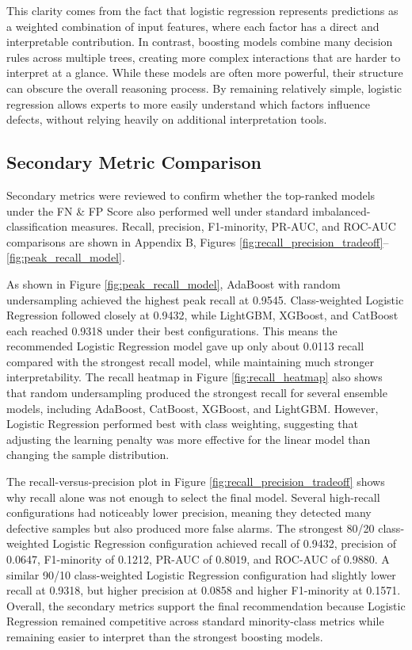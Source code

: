 \documentclass{article}
\begin{document}
This clarity comes from the fact that logistic regression represents predictions as a weighted combination of input features, where each factor has a direct and interpretable contribution. In contrast, boosting models combine many decision rules across multiple trees, creating more complex interactions that are harder to interpret at a glance. While these models are often more powerful, their structure can obscure the overall reasoning process. By remaining relatively simple, logistic regression allows experts to more easily understand which factors influence defects, without relying heavily on additional interpretation tools.

\subsection{Secondary Metric Comparison}

Secondary metrics were reviewed to confirm whether the top-ranked models under the FN \& FP Score also performed well under standard imbalanced-classification measures. Recall, precision, F1-minority, PR-AUC, and ROC-AUC comparisons are shown in Appendix B, Figures \ref{fig:recall_precision_tradeoff}--\ref{fig:peak_recall_model}.

As shown in Figure \ref{fig:peak_recall_model}, AdaBoost with random undersampling achieved the highest peak recall at 0.9545. Class-weighted Logistic Regression followed closely at 0.9432, while LightGBM, XGBoost, and CatBoost each reached 0.9318 under their best configurations. This means the recommended Logistic Regression model gave up only about 0.0113 recall compared with the strongest recall model, while maintaining much stronger interpretability. The recall heatmap in Figure \ref{fig:recall_heatmap} also shows that random undersampling produced the strongest recall for several ensemble models, including AdaBoost, CatBoost, XGBoost, and LightGBM. However, Logistic Regression performed best with class weighting, suggesting that adjusting the learning penalty was more effective for the linear model than changing the sample distribution.

The recall-versus-precision plot in Figure \ref{fig:recall_precision_tradeoff} shows why recall alone was not enough to select the final model. Several high-recall configurations had noticeably lower precision, meaning they detected many defective samples but also produced more false alarms. The strongest 80/20 class-weighted Logistic Regression configuration achieved recall of 0.9432, precision of 0.0647, F1-minority of 0.1212, PR-AUC of 0.8019, and ROC-AUC of 0.9880. A similar 90/10 class-weighted Logistic Regression configuration had slightly lower recall at 0.9318, but higher precision at 0.0858 and higher F1-minority at 0.1571. Overall, the secondary metrics support the final recommendation because Logistic Regression remained competitive across standard minority-class metrics while remaining easier to interpret than the strongest boosting models.
\end{document}

